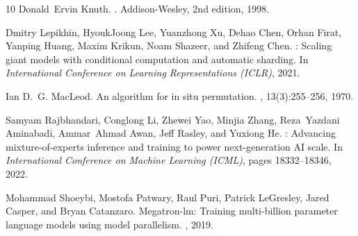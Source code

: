 \documentclass[10pt,twocolumn]{article}
\begin{document}
\begin{thebibliography}{10}
Donald~Ervin Knuth.
.
\newblock Addison-Wesley, 2nd edition, 1998.

Dmitry Lepikhin, HyoukJoong Lee, Yuanzhong Xu, Dehao Chen, Orhan Firat, Yanping Huang, Maxim Krikun, Noam Shazeer, and Zhifeng Chen.
: Scaling giant models with conditional computation and automatic sharding.
\newblock In {\em International Conference on Learning Representations (ICLR)}, 2021.

Ian D.~G. MacLeod.
\newblock An algorithm for in situ permutation.
, 13(3):255--256, 1970.

Samyam Rajbhandari, Conglong Li, Zhewei Yao, Minjia Zhang, Reza~Yazdani Aminabadi, Ammar~Ahmad Awan, Jeff Rasley, and Yuxiong He.
: Advancing mixture-of-experts inference and training to power next-generation {AI} scale.
\newblock In {\em International Conference on Machine Learning (ICML)}, pages 18332--18346, 2022.

Mohammad Shoeybi, Mostofa Patwary, Raul Puri, Patrick LeGresley, Jared Casper, and Bryan Catanzaro.
\newblock Megatron-lm: Training multi-billion parameter language models using model parallelism.
, 2019.

\end{thebibliography}
\endgroup
\end{document}
